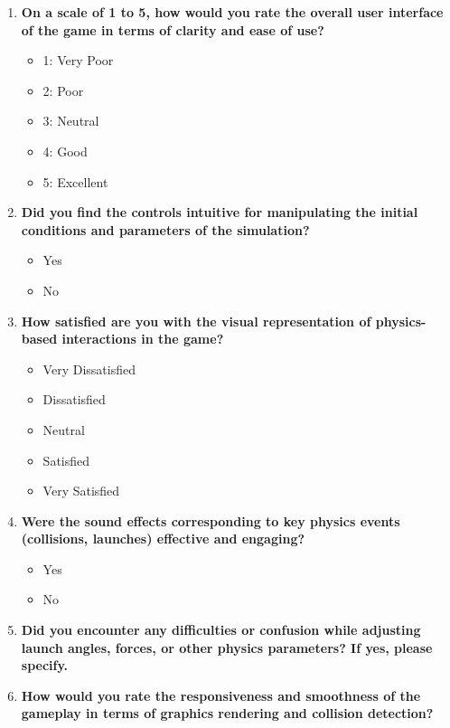 \documentclass[
]{article}
\begin{document}
\begin{enumerate}
\def\labelenumi{\arabic{enumi}.}
\item
  \textbf{On a scale of 1 to 5, how would you rate the overall user
  interface of the game in terms of clarity and ease of use?}

  \begin{itemize}
  \item
    1: Very Poor
  \item
    2: Poor
  \item
    3: Neutral
  \item
    4: Good
  \item
    5: Excellent
  \end{itemize}
\item
  \textbf{Did you find the controls intuitive for manipulating the
  initial conditions and parameters of the simulation?}

  \begin{itemize}
  \item
    Yes
  \item
    No
  \end{itemize}
\item
  \textbf{How satisfied are you with the visual representation of
  physics-based interactions in the game?}

  \begin{itemize}
  \item
    Very Dissatisfied
  \item
    Dissatisfied
  \item
    Neutral
  \item
    Satisfied
  \item
    Very Satisfied
  \end{itemize}
\item
  \textbf{Were the sound effects corresponding to key physics events
  (collisions, launches) effective and engaging?}

  \begin{itemize}
  \item
    Yes
  \item
    No
  \end{itemize}
\item
  \textbf{Did you encounter any difficulties or confusion while
  adjusting launch angles, forces, or other physics parameters? If yes,
  please specify.}
\item
  \textbf{How would you rate the responsiveness and smoothness of the
  gameplay in terms of graphics rendering and collision detection?}


\end{enumerate}
\end{document}
